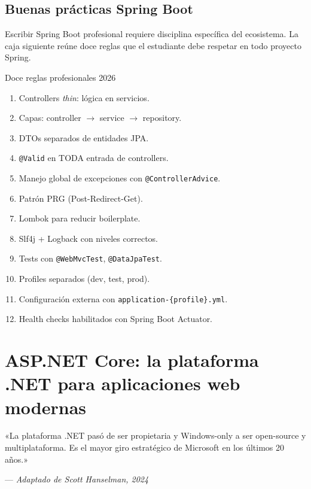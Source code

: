 \documentclass[11pt,a4paper,openany]{book}
\begin{document}
\section{Buenas prácticas Spring Boot}

Escribir Spring Boot profesional requiere disciplina específica
del ecosistema. La caja siguiente reúne doce reglas que el
estudiante debe respetar en todo proyecto Spring.


\begin{cajabuenas}{Doce reglas profesionales 2026}
\begin{enumerate}
\item Controllers \emph{thin}: lógica en servicios.
\item Capas: controller $\to$ service $\to$ repository.
\item DTOs separados de entidades JPA.
\item \texttt{@Valid} en TODA entrada de controllers.
\item Manejo global de excepciones con
\texttt{@ControllerAdvice}.
\item Patrón PRG (Post-Redirect-Get).
\item Lombok para reducir boilerplate.
\item Slf4j + Logback con niveles correctos.
\item Tests con \texttt{@WebMvcTest},
\texttt{@DataJpaTest}.
\item Profiles separados (dev, test, prod).
\item Configuración externa con
\texttt{application-\{profile\}.yml}.
\item Health checks habilitados con Spring Boot Actuator.
\end{enumerate}
\end{cajabuenas}


\chapter{ASP.NET Core: la plataforma .NET para aplicaciones web modernas}
\label{cap:semana7}

\epigraph{«La plataforma .NET pasó de ser propietaria y Windows-only a
ser open-source y multiplataforma. Es el mayor giro estratégico de
Microsoft en los últimos 20 años.»}{--- \textit{Adaptado de Scott
Hanselman, 2024}}
\end{document}
